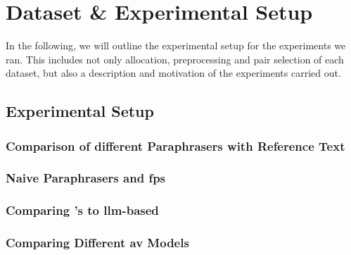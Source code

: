 \chapter{Dataset \& Experimental Setup}
\label{chap:dataset_experimental_setup}

In the following, we will outline the experimental setup for the experiments we ran.
This includes not only allocation, preprocessing and pair selection of each dataset, but also a description and motivation of the experiments carried out.




\section{Experimental Setup}
\label{sec:experimental_setup}





\subsection{Comparison of different Paraphrasers with Reference Text}



\subsection{Naive Paraphrasers and \acp{fp}}

\subsection{Comparing \citet{koppel_determining_2014}'s to \ac{llm}-based \imps{}}

\subsection{Comparing Different \ac{av} Models}





